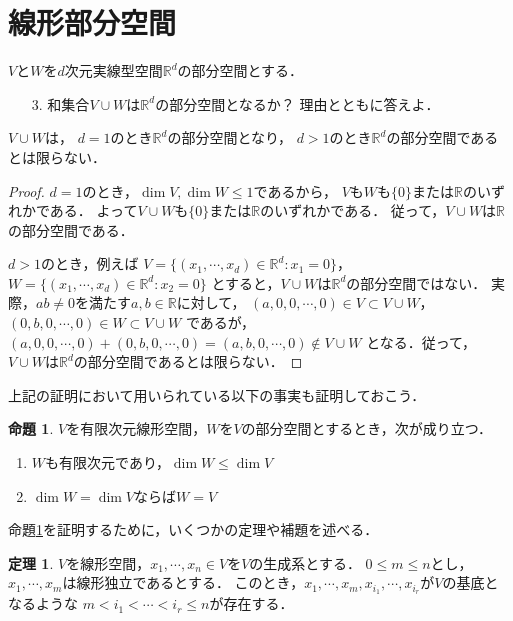 \documentclass{jsarticle}
\theoremstyle{definition}
\newtheorem{prop}[defi]{命題}
\newtheorem{thm}[defi]{定理}
\begin{document}
\section{線形部分空間}

\begin{screen}
$V$と$W$を$d$次元実線型空間$\mathbb{R}^d$の部分空間とする．
\begin{itemize}
\item[3.]和集合$V\cup W$は$\mathbb{R}^d$の部分空間となるか？
理由とともに答えよ．
\end{itemize}
\end{screen}

$V\cup W$は，
$d=1$のとき$\mathbb{R}^d$の部分空間となり，
$d>1$のとき$\mathbb{R}^d$の部分空間であるとは限らない．

\begin{proof}
$d=1$のとき，$\dim{V},\dim{W}\leq1$であるから，
$V$も$W$も$\{0\}$または$\mathbb{R}$のいずれかである．
よって$V\cup W$も$\{0\}$または$\mathbb{R}$のいずれかである．
従って，$V\cup W$は$\mathbb{R}$の部分空間である．

$d>1$のとき，例えば
$V=\{(x_1,\cdots,x_d)\in\mathbb{R}^d:x_1=0\}$，
$W=\{(x_1,\cdots,x_d)\in\mathbb{R}^d:x_2=0\}$
とすると，$V\cup W$は$\mathbb{R}^d$の部分空間ではない．
実際，$ab\neq0$を満たす$a,b\in\mathbb{R}$に対して，
$(a,0,0,\cdots,0)\in V\subset V\cup W$，$(0,b,0,\cdots,0)\in W\subset V\cup W$
であるが，
$(a,0,0,\cdots,0)+(0,b,0,\cdots,0)=(a,b,0,\cdots,0)\notin V\cup W$
となる．従って，$V\cup W$は$\mathbb{R}^d$の部分空間であるとは限らない．
\end{proof}

上記の証明において用いられている以下の事実も証明しておこう．

\begin{prop}\label{dim}
$V$を有限次元線形空間，$W$を$V$の部分空間とするとき，次が成り立つ．
\begin{enumerate}
\item $W$も有限次元であり，$\dim{W}\leq\dim{V}$
\item $\dim{W}=\dim{V}$ならば$W=V$
\end{enumerate}
\end{prop}

命題\ref{dim}を証明するために，いくつかの定理や補題を述べる．

\begin{thm}\label{basis}
$V$を線形空間，$x_1,\cdots,x_n\in V$を$V$の生成系とする．
$0\leq m\leq n$とし，$x_1,\cdots,x_m$は線形独立であるとする．
このとき，$x_1,\cdots,x_m,x_{i_1},\cdots,x_{i_r}$が$V$の基底となるような
$m<i_1<\cdots<i_r\leq n$が存在する．
\end{thm}
\end{document}
